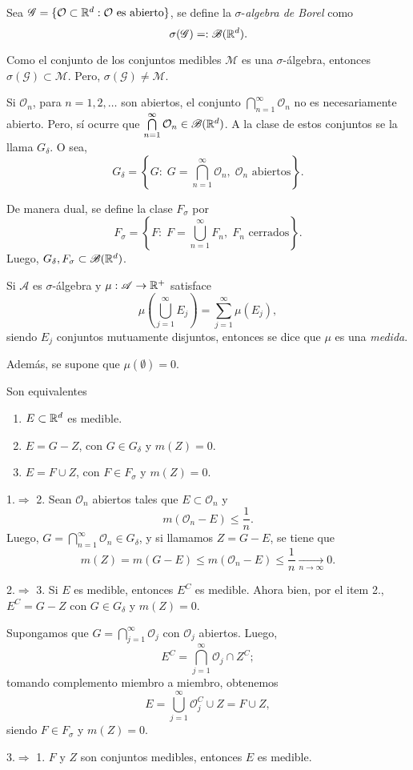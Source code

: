 Sea $\mathscr{G}=\{\mathcal{O}\subset \mathbb{R}^d: \mathcal{O} \mbox{ es abierto} \}$, se define la $\sigma$-\emph{\;algebra de Borel} como
\[
\sigma(\mathscr{G})=:\mathscr{B}(\mathbb{R}^d).
\]

Como el conjunto de los conjuntos medibles $\mathscr{M}$ es una $\sigma$-\'algebra, entonces $\sigma(\mathscr{G})\subset \mathscr{M}$.
Pero, $\sigma(\mathscr{G})\neq \mathscr{M}$.

Si $\mathcal{O}_n$, para $n=1,2,\ldots$ son abiertos, el conjunto
$\bigcap\limits_{n=1}^{\infty} \mathcal{O}_n$ no es necesariamente abierto. Pero, s\'i ocurre que $\bigcap\limits_{n=1}^{\infty} \mathcal{O}_n \in \mathscr{B}(\mathbb{R}^d)$. 
A la clase de estos conjuntos se la llama $G_{\delta}$.
O sea, 
\[
G_{\delta}=\left\{  
G:\; G=\bigcap\limits_{n=1}^{\infty} \mathcal{O}_n,\; \mathcal{O}_n \mbox{ abiertos}
\right\}.
\]


De manera dual, se define la clase $F_{\sigma}$ por
\[
F_{\sigma}=\left\{  
F:\; F=\bigcup\limits_{n=1}^{\infty} F_n,\; F_n \mbox{ cerrados}
\right\}.
\]
Luego,  $G_{\delta}, F_{\sigma} \subset \mathscr{B}(\mathbb{R}^d)$.

\begin{definicion}{}
Si $\mathscr{A}$  es $\sigma$-\'algebra y $\mu:\mathscr{A} \to \mathbb{R}^+$ satisface
\[\mu\left(\bigcup\limits_{j=1}^{\infty}E_j \right)
=\sum\limits_{j=1}^{\infty}\mu(E_j),
\]
siendo $E_j$ conjuntos mutuamente disjuntos, 
entonces se dice que $\mu$ es una \emph{medida}.

Adem\'as, se supone que $\mu(\emptyset)=0$.
\end{definicion}


\begin{teorema}{}
Son equivalentes
\begin{enumerate}
    \item $E\subset \mathbb{R}^d$ es medible.
    \item $E=G-Z$, con $G\in G_{\delta}$ y $m(Z)=0$.
    \item $E=F\cup Z$, con $F \in F_{\sigma}$ y $m(Z)=0$.
\end{enumerate}
\end{teorema}

\begin{demo}{}
1.$\Rightarrow$ 2.
Sean $\mathcal{O}_n$ abiertos tales que $E\subset \mathcal{O}_n$ y 
\[
m(\mathcal{O}_n-E)\leq \frac{1}{n}.
\]
Luego, $G=\bigcap\limits_{n=1}^{\infty} \mathcal{O}_n \in G_{\delta}$, 
y si llamamos $Z=G-E$, se tiene que 
\[m(Z)=
m(G-E)\leq m(\mathcal{O}_n-E)\leq \frac{1}{n}\xrightarrow[n \to \infty]{}0.
\]

2.$\Rightarrow$ 3.
Si $E$ es medible, entonces $E^C$ es medible. Ahora bien,  por el item 2., $E^C=G-Z$ con $G \in G_{\delta}$  y $m(Z)=0$. 

Supongamos que $G=\bigcap\limits_{j=1}^{\infty} \mathcal{O}_j$ 
con $\mathcal{O}_j$ abiertos.
Luego, 
\[E^C=\bigcap\limits_{j=1}^{\infty} \mathcal{O}_j \cap Z^C;
\]
tomando complemento miembro a miembro, obtenemos
\[
E=\bigcup\limits_{j=1}^{\infty} \mathcal{O}_j^C \cup Z=F\cup Z,
\]
siendo $F \in F_{\sigma}$ y $m(Z)=0$.

3.$\Rightarrow$ 1. $F$ y $Z$ son conjuntos medibles, entonces $E$ es medible.
\end{demo}


